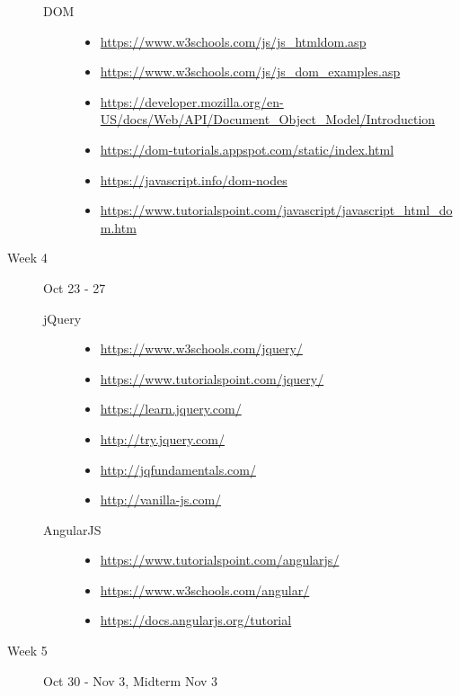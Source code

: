 \documentclass{article}
\begin{document}
\begin{description}
\begin{description}
\item[DOM]\mbox{}
  \begin{itemize}
  \item\scriptsize\url{https://www.w3schools.com/js/js_htmldom.asp}
  \item\scriptsize\url{https://www.w3schools.com/js/js_dom_examples.asp}
  \item\scriptsize\url{https://developer.mozilla.org/en-US/docs/Web/API/Document_Object_Model/Introduction}
  \item\scriptsize\url{https://dom-tutorials.appspot.com/static/index.html}
  \item\scriptsize\url{https://javascript.info/dom-nodes}
  \item\scriptsize\url{https://www.tutorialspoint.com/javascript/javascript_html_dom.htm}
  \end{itemize}


  \end{description}
  \item[Week 4] Oct 23 - 27
\begin{description}


\item[jQuery]\mbox{}
  \begin{itemize}
  \item\scriptsize\url{https://www.w3schools.com/jquery/}
  \item\scriptsize\url{https://www.tutorialspoint.com/jquery/}
  \item\scriptsize\url{https://learn.jquery.com/}
  \item\scriptsize\url{http://try.jquery.com/}
  \item\scriptsize\url{http://jqfundamentals.com/}
  \item\scriptsize\url{http://vanilla-js.com/}

  \end{itemize}

  
\item[AngularJS]\mbox{}
  \begin{itemize}
    \item\scriptsize\url{https://www.tutorialspoint.com/angularjs/}
    \item\scriptsize\url{https://www.w3schools.com/angular/}
    \item\scriptsize\url{https://docs.angularjs.org/tutorial}
  \end{itemize}
  


\end{description}
\item[Week 5] Oct 30 - Nov 3,  Midterm Nov 3
  \begin{description}



\end{description}
\end{description}
\end{document}
